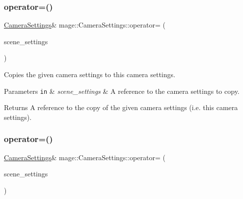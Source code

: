 \hypertarget{classmage_1_1_camera_settings_aaabd402e2e9510d0e44ec31320baff87}{}\label{classmage_1_1_camera_settings_aaabd402e2e9510d0e44ec31320baff87} 
\subsubsection{\texorpdfstring{operator=()}{operator=()}\hspace{0.1cm}{\footnotesize\ttfamily [1/2]}}
{\footnotesize\ttfamily \hyperlink{classmage_1_1_camera_settings}{Camera\+Settings}\& mage\+::\+Camera\+Settings\+::operator= (\begin{DoxyParamCaption}\item[{const \hyperlink{classmage_1_1_camera_settings}{Camera\+Settings} \&}]{scene\+\_\+settings }\end{DoxyParamCaption})\hspace{0.3cm}{\ttfamily [default]}}

Copies the given camera settings to this camera settings.


\begin{DoxyParams}[1]{Parameters}
\mbox{\tt in}  & {\em scene\+\_\+settings} & A reference to the camera settings to copy. \\
\hline
\end{DoxyParams}
\begin{DoxyReturn}{Returns}
A reference to the copy of the given camera settings (i.\+e. this camera settings). 
\end{DoxyReturn}
\hypertarget{classmage_1_1_camera_settings_a5104072c8c15e8dfc0b9459a537afe5e}{}\label{classmage_1_1_camera_settings_a5104072c8c15e8dfc0b9459a537afe5e} 
\subsubsection{\texorpdfstring{operator=()}{operator=()}\hspace{0.1cm}{\footnotesize\ttfamily [2/2]}}
{\footnotesize\ttfamily \hyperlink{classmage_1_1_camera_settings}{Camera\+Settings}\& mage\+::\+Camera\+Settings\+::operator= (\begin{DoxyParamCaption}\item[{\hyperlink{classmage_1_1_camera_settings}{Camera\+Settings} \&\&}]{scene\+\_\+settings }\end{DoxyParamCaption})\hspace{0.3cm}{\ttfamily [default]}}

